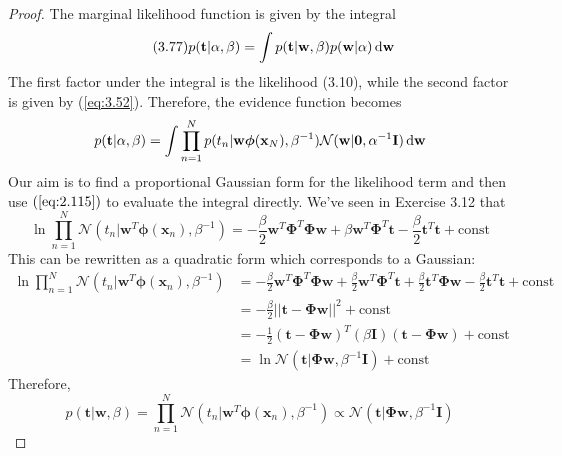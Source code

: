 \begin{proof}
    The marginal likelihood function is given
    by the integral
    \begin{equation}\label{eq:3.77}\tag{3.77}
        p(\mathbf{t} | \alpha, \beta)
        = \int p(\mathbf{t} | \mathbf{w}, \beta) p(\mathbf{w} | \alpha) \mathop{}\!\mathrm{d} \mathbf{w} 
    \end{equation}
    The first factor under the integral is the likelihood
    (3.10), while the second factor is given
    by (\ref{eq:3.52}). Therefore, the evidence function becomes
    \[
        p(\mathbf{t} | \alpha, \beta) 
        = \int \prod_{n = 1}^N p(t_n | \mathbf{w}\bm{\phi}(\mathbf{x}_N), \beta^{-1}) 
        \mathcal{N}(\mathbf{w} | \mathbf{0}, \alpha^{-1}\mathbf{I}) \mathop{}\!\mathrm{d} \mathbf{w}
    \] 
    Our aim is to find a proportional Gaussian form for the 
    likelihood term and then use $(\ref{eq:2.115})$ to 
    evaluate the integral directly. We've seen in Exercise 3.12
    that 
    \[
        \ln \prod_{n=1}^N \mathcal{N}(t_n | \mathbf{w}^T\bm{\phi}(\mathbf{x}_n), \beta^{-1})
        = -\frac{\beta}{2} \mathbf{w}^T\mathbf{\Phi}^T\mathbf{\Phi}\mathbf{w}
            +\beta \mathbf{w}^T \mathbf{\Phi}^T \mathbf{t} 
            -\frac{\beta}{2} \mathbf{t}^T\mathbf{t}
            + \text{const}
    \]
    This can be rewritten as a quadratic form which corresponds to a Gaussian:
    \begin{align*}
        \ln \prod_{n=1}^N \mathcal{N}(t_n | \mathbf{w}^T\bm{\phi}(\mathbf{x}_n), \beta^{-1})
        &= -\frac{\beta}{2} \mathbf{w}^T\mathbf{\Phi}^T\mathbf{\Phi}\mathbf{w}
            +\frac{\beta}{2}\mathbf{w}^T \mathbf{\Phi}^T \mathbf{t} 
            +\frac{\beta}{2}\mathbf{t}^T \mathbf{\Phi} \mathbf{w} 
            -\frac{\beta}{2} \mathbf{t}^T\mathbf{t}
            + \text{const} \\
        &=  -\frac{\beta}{2} ||\mathbf{t} - \mathbf{\Phi}\mathbf{w}||^2 + \text{const} \\
        &=  -\frac{1}{2} (\mathbf{t} - \mathbf{\Phi}\mathbf{w})^T
            (\beta \mathbf{I})(\mathbf{t} - \mathbf{\Phi}\mathbf{w}) + \text{const} \\
        &= \ln \mathcal{N}(\mathbf{t} | \mathbf{\Phi}\mathbf{w}, \beta^{-1}\mathbf{I})
            + \text{const}
    \end{align*}
    Therefore,
    \[
        p(\mathbf{t} | \mathbf{w}, \beta) 
        = \prod_{n=1}^N \mathcal{N}(t_n | \mathbf{w}^T\bm{\phi}(\mathbf{x}_n), \beta^{-1})
        \propto \mathcal{N}(\mathbf{t} | \mathbf{\Phi}\mathbf{w}, \beta^{-1}\mathbf{I})
\]
\end{proof}
